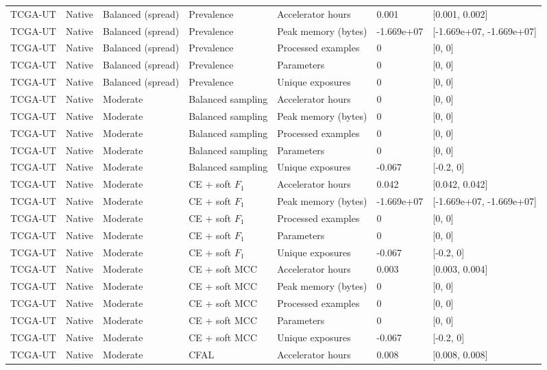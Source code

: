 \begin{longtable}{lllllll}
TCGA-UT & Native & Balanced (spread) & Prevalence & Accelerator hours & 0.001 & [0.001, 0.002] \\
TCGA-UT & Native & Balanced (spread) & Prevalence & Peak memory (bytes) & -1.669e+07 & [-1.669e+07, -1.669e+07] \\
TCGA-UT & Native & Balanced (spread) & Prevalence & Processed examples & 0 & [0, 0] \\
TCGA-UT & Native & Balanced (spread) & Prevalence & Parameters & 0 & [0, 0] \\
TCGA-UT & Native & Balanced (spread) & Prevalence & Unique exposures & 0 & [0, 0] \\
TCGA-UT & Native & Moderate & Balanced sampling & Accelerator hours & 0 & [0, 0] \\
TCGA-UT & Native & Moderate & Balanced sampling & Peak memory (bytes) & 0 & [0, 0] \\
TCGA-UT & Native & Moderate & Balanced sampling & Processed examples & 0 & [0, 0] \\
TCGA-UT & Native & Moderate & Balanced sampling & Parameters & 0 & [0, 0] \\
TCGA-UT & Native & Moderate & Balanced sampling & Unique exposures & -0.067 & [-0.2, 0] \\
TCGA-UT & Native & Moderate & CE + soft $F_1$ & Accelerator hours & 0.042 & [0.042, 0.042] \\
TCGA-UT & Native & Moderate & CE + soft $F_1$ & Peak memory (bytes) & -1.669e+07 & [-1.669e+07, -1.669e+07] \\
TCGA-UT & Native & Moderate & CE + soft $F_1$ & Processed examples & 0 & [0, 0] \\
TCGA-UT & Native & Moderate & CE + soft $F_1$ & Parameters & 0 & [0, 0] \\
TCGA-UT & Native & Moderate & CE + soft $F_1$ & Unique exposures & -0.067 & [-0.2, 0] \\
TCGA-UT & Native & Moderate & CE + soft MCC & Accelerator hours & 0.003 & [0.003, 0.004] \\
TCGA-UT & Native & Moderate & CE + soft MCC & Peak memory (bytes) & 0 & [0, 0] \\
TCGA-UT & Native & Moderate & CE + soft MCC & Processed examples & 0 & [0, 0] \\
TCGA-UT & Native & Moderate & CE + soft MCC & Parameters & 0 & [0, 0] \\
TCGA-UT & Native & Moderate & CE + soft MCC & Unique exposures & -0.067 & [-0.2, 0] \\
TCGA-UT & Native & Moderate & CFAL & Accelerator hours & 0.008 & [0.008, 0.008] \\

\end{longtable}
